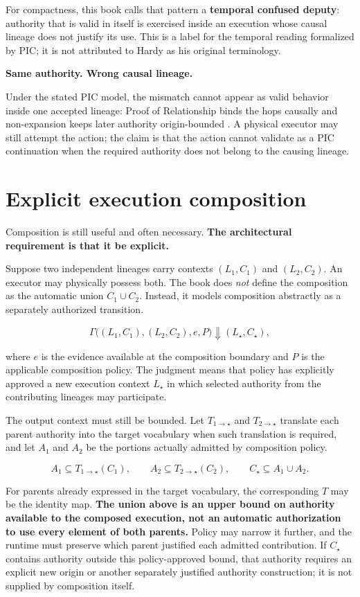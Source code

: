 \documentclass[10pt,oneside,openany]{book}
\newcommand{\term}[1]{\textbf{#1}}
\begin{document}
For compactness, this book calls that pattern a \term{temporal confused deputy}: authority that is valid in itself is exercised inside an execution whose causal lineage does not justify its use. This is a label for the temporal reading formalized by PIC; it is not attributed to Hardy as his original terminology.

\begin{center}
\sffamily\bfseries
Same authority. Wrong causal lineage.
\end{center}

Under the stated PIC model, the mismatch cannot appear as valid behavior inside one accepted lineage: Proof of Relationship binds the hops causally and non-expansion keeps later authority origin-bounded \cite{gallo2026pic}. A physical executor may still attempt the action; the claim is that the action cannot validate as a PIC continuation when the required authority does not belong to the causing lineage.

\section{Explicit execution composition}
Composition is still useful and often necessary. \textbf{The architectural requirement is that it be explicit.}

Suppose two independent lineages carry contexts $(L_1,C_1)$ and $(L_2,C_2)$. An executor may physically possess both. The book does \emph{not} define the composition as the automatic union $C_1\cup C_2$. Instead, it models composition abstractly as a separately authorized transition.
\begin{formulabox}
\[
\Gamma\bigl((L_1,C_1),(L_2,C_2),e,P\bigr) \Downarrow (L_\star,C_\star),
\]
\end{formulabox}
where $e$ is the evidence available at the composition boundary and $P$ is the applicable composition policy. The judgment means that policy has explicitly approved a new execution context $L_\star$ in which selected authority from the contributing lineages may participate.

The output context must still be bounded. Let $T_{1\rightarrow\star}$ and $T_{2\rightarrow\star}$ translate each parent authority into the target vocabulary when such translation is required, and let $A_1$ and $A_2$ be the portions actually admitted by composition policy.
\begin{formulabox}
\[
A_1\subseteq T_{1\rightarrow\star}(C_1),\qquad
A_2\subseteq T_{2\rightarrow\star}(C_2),\qquad
C_\star\subseteq A_1\cup A_2.
\]
\end{formulabox}
For parents already expressed in the target vocabulary, the corresponding $T$ may be the identity map. \textbf{The union above is an upper bound on authority available to the composed execution, not an automatic authorization to use every element of both parents.} Policy may narrow it further, and the runtime must preserve which parent justified each admitted contribution. If $C_\star$ contains authority outside this policy-approved bound, that authority requires an explicit new origin or another separately justified authority construction; it is not supplied by composition itself.
\end{document}
